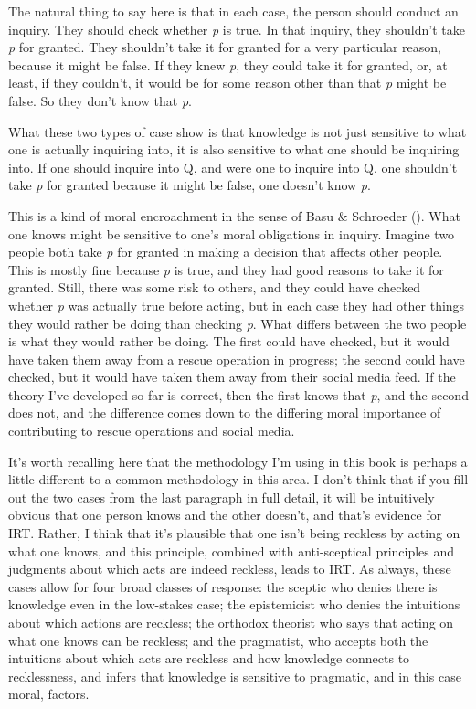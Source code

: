 \documentclass[
  10pt,
  letterpaper,
  twoside]{scrbook}
\begin{document}
The natural thing to say here is that in each case, the person should
conduct an inquiry. They should check whether \emph{p} is true. In that
inquiry, they shouldn't take \emph{p} for granted. They shouldn't take
it for granted for a very particular reason, because it might be false.
If they knew \emph{p}, they could take it for granted, or, at least, if
they couldn't, it would be for some reason other than that \emph{p}
might be false. So they don't know that \emph{p}.

What these two types of case show is that knowledge is not just
sensitive to what one is actually inquiring into, it is also sensitive
to what one should be inquiring into. If one should inquire into Q, and
were one to inquire into Q, one shouldn't take \emph{p} for granted
because it might be false, one doesn't know \emph{p}.~

This is a kind of moral encroachment in the sense of Basu \& Schroeder
(). What one knows might be
sensitive to one's moral obligations in inquiry. Imagine two people both
take \emph{p} for granted in making a decision that affects other
people. This is mostly fine because \emph{p} is true, and they had good
reasons to take it for granted. Still, there was some risk to others,
and they could have checked whether \emph{p} was actually true before
acting, but in each case they had other things they would rather be
doing than checking \emph{p}. What differs between the two people is
what they would rather be doing. The first could have checked, but it
would have taken them away from a rescue operation in progress; the
second could have checked, but it would have taken them away from their
social media feed. If the theory I've developed so far is correct, then
the first knows that \emph{p}, and the second does not, and the
difference comes down to the differing moral importance of contributing
to rescue operations and social media.

It's worth recalling here that the methodology I'm using in this book is
perhaps a little different to a common methodology in this area. I don't
think that if you fill out the two cases from the last paragraph in full
detail, it will be intuitively obvious that one person knows and the
other doesn't, and that's evidence for IRT. Rather, I think that it's
plausible that one isn't being reckless by acting on what one knows, and
this principle, combined with anti-sceptical principles and judgments
about which acts are indeed reckless, leads to IRT. As always, these
cases allow for four broad classes of response: the sceptic who denies
there is knowledge even in the low-stakes case; the epistemicist who
denies the intuitions about which actions are reckless; the orthodox
theorist who says that acting on what one knows can be reckless; and the
pragmatist, who accepts both the intuitions about which acts are
reckless and how knowledge connects to recklessness, and infers that
knowledge is sensitive to pragmatic, and in this case moral, factors.
\end{document}
